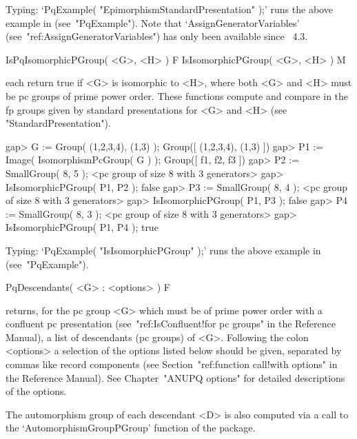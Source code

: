 Typing: `PqExample( "EpimorphismStandardPresentation" );' runs the  above
example in {\GAP} (see~"PqExample"). Note that `AssignGeneratorVariables'
(see~"ref:AssignGeneratorVariables")  has  only  been   available   since
{\GAP}~4.3.


\>IsPqIsomorphicPGroup( <G>, <H> ) F
\>IsIsomorphicPGroup( <G>, <H> ) M

each return true if <G> is isomorphic to <H>, where both <G> and <H> must
be pc groups of prime power order. These functions  compute  and  compare
in {\GAP} the fp groups given by standard presentations for <G>  and  <H>
(see "StandardPresentation").

\beginexample
gap> G := Group( (1,2,3,4), (1,3) );
Group([ (1,2,3,4), (1,3) ])
gap> P1 := Image( IsomorphismPcGroup( G ) );
Group([ f1, f2, f3 ])
gap> P2 := SmallGroup( 8, 5 );
<pc group of size 8 with 3 generators>
gap> IsIsomorphicPGroup( P1, P2 );
false
gap> P3 := SmallGroup( 8, 4 );
<pc group of size 8 with 3 generators>
gap> IsIsomorphicPGroup( P1, P3 );
false
gap> P4 := SmallGroup( 8, 3 );
<pc group of size 8 with 3 generators>
gap> IsIsomorphicPGroup( P1, P4 );
true
\endexample

Typing: `PqExample( "IsIsomorphicPGroup" );' runs the  above  example  in
{\GAP} (see~"PqExample").


\>PqDescendants( <G> : <options> ) F

returns, for the pc group <G> which must be of prime power order  with  a
confluent pc presentation (see~"ref:IsConfluent!for  pc  groups"  in  the
{\GAP} Reference Manual), a list  of  descendants  (pc  groups)  of  <G>.
Following the colon <options> a selection of  the  options  listed  below
should  be  given,  separated  by  commas  like  record  components  (see
Section~"ref:function call!with options" in the {\GAP} Reference Manual).
See Chapter~"ANUPQ options" for detailed descriptions of the options.

The automorphism group of each descendant <D> is also computed via a call
to the `AutomorphismGroupPGroup' function of the {\AutPGrp} package.

